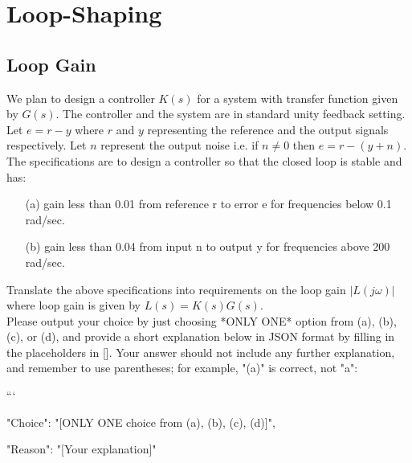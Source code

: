 \documentclass[12pt]{article}
\begin{document}
\section{Loop-Shaping}
\subsection{Loop Gain}

We plan to design a controller $K(s)$ for a system with transfer function given by $G(s)$. The controller and the system are in standard unity feedback setting. Let $e=r-y$ where $r$ and $y$ representing the reference and the output signals respectively. Let $n$ represent the output noise i.e. if $n \neq 0$ then $e=r- (y+n)$. The specifications are to design a controller so that the closed loop is stable and has:
\begin{itemize}
    \item [(a)] gain less than 0.01 from reference r to error e for frequencies below 0.1 rad/sec.
    \item [(b)] gain less than 0.04 from input n to output y for frequencies above 200 rad/sec. 
\end{itemize}
Translate the above specifications into requirements on the loop gain $|L(j \omega)|$ where loop gain is given by $L(s)=K(s) G(s)$.\\
Please output your choice by just choosing *ONLY ONE* option from (a), (b), (c), or (d), and provide a short explanation below in JSON format by filling in the placeholders in []. Your answer should not include any further explanation, and remember to use parentheses; for example, "(a)" is correct, not "a":

```
{

"Choice": "[ONLY ONE choice from (a), (b), (c), (d)]",

"Reason": "[Your explanation]"

}
\end{document}

